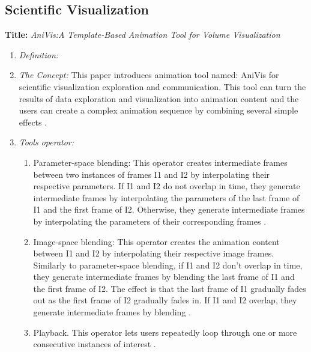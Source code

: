\documentclass{egpubl}
\begin{document}
\subsection{Scientific Visualization}
\textbf{Title:} \textit{AniVis:A Template-Based Animation Tool for Volume Visualization}
\begin{enumerate}
\item \textit{Definition:} 
\item \textit{The Concept:} This paper introduces animation tool named: AniVis for scientific visualization exploration and communication. This tool can turn the results of data exploration and visualization into animation content and the users can create a complex animation sequence by combining several simple effects \cite{Akiba}.
\item \textit{Tools operator:}
\begin{enumerate}
\item Parameter-space blending: This operator creates intermediate frames between two instances of frames I1 and I2 by interpolating their respective parameters. If I1 and I2 do not overlap in time, they generate intermediate frames by interpolating the parameters of the last frame of I1 and the first frame of I2. Otherwise, they generate intermediate frames by interpolating the parameters of their corresponding frames \cite{Akiba}.

\item Image-space blending: This operator creates the animation content between I1 and I2 by interpolating their respective image frames. Similarly to parameter-space blending, if I1 and I2 don't overlap in time, they generate intermediate frames by blending the last frame of I1 and the first frame of I2. The effect is that the last frame of I1 gradually fades out as the first frame of I2 gradually fades in. If I1 and I2 overlap, they generate intermediate frames by blending \cite{Akiba}.

\item Playback. This operator lets users repeatedly loop through one or more consecutive instances of interest \cite{Akiba}.

\end{enumerate}


\end{enumerate}
\end{document}
